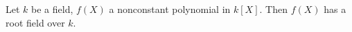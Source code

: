 Let $k$ be a field, $f(X)$ a nonconstant polynomial in $k[X]$. Then $f(X)$ has a root field over $k$.
